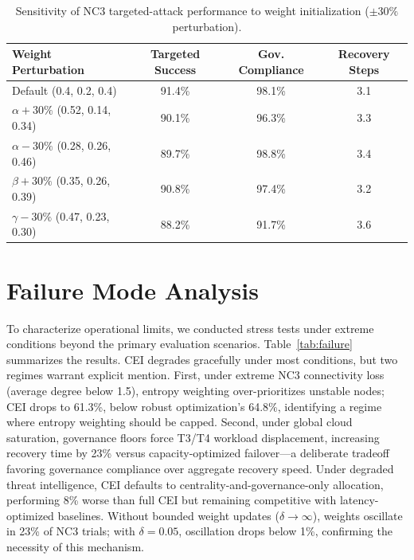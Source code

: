 \documentclass[runningheads]{llncs}
\begin{document}
\begin{table}[ht]
\caption{Sensitivity of NC3 targeted-attack performance to weight initialization ($\pm 30\%$ perturbation).}
\label{tab:sens}
\centering
\small
\begin{tabular}{lccc}
\toprule
Weight Perturbation & Targeted Success & Gov. Compliance & Recovery Steps \\
\midrule
Default (0.4, 0.2, 0.4)        & 91.4\% & 98.1\% & 3.1 \\
$\alpha +30\%$ (0.52, 0.14, 0.34) & 90.1\% & 96.3\% & 3.3 \\
$\alpha -30\%$ (0.28, 0.26, 0.46) & 89.7\% & 98.8\% & 3.4 \\
$\beta +30\%$ (0.35, 0.26, 0.39)  & 90.8\% & 97.4\% & 3.2 \\
$\gamma -30\%$ (0.47, 0.23, 0.30) & 88.2\% & 91.7\% & 3.6 \\
\bottomrule
\end{tabular}
\end{table}

\section{Failure Mode Analysis}
\label{sec:failuremode}

To characterize operational limits, we conducted stress tests under extreme conditions beyond the primary evaluation scenarios. Table~\ref{tab:failure} summarizes the results. CEI degrades gracefully under most conditions, but two regimes warrant explicit mention. First, under extreme NC3 connectivity loss (average degree below 1.5), entropy weighting over-prioritizes unstable nodes; CEI drops to 61.3\%, below robust optimization's 64.8\%, identifying a regime where entropy weighting should be capped. Second, under global cloud saturation, governance floors force T3/T4 workload displacement, increasing recovery time by 23\% versus capacity-optimized failover---a deliberate tradeoff favoring governance compliance over aggregate recovery speed. Under degraded threat intelligence, CEI defaults to centrality-and-governance-only allocation, performing 8\% worse than full CEI but remaining competitive with latency-optimized baselines. Without bounded weight updates ($\delta \to \infty$), weights oscillate in 23\% of NC3 trials; with $\delta = 0.05$, oscillation drops below 1\%, confirming the necessity of this mechanism.
\end{document}
